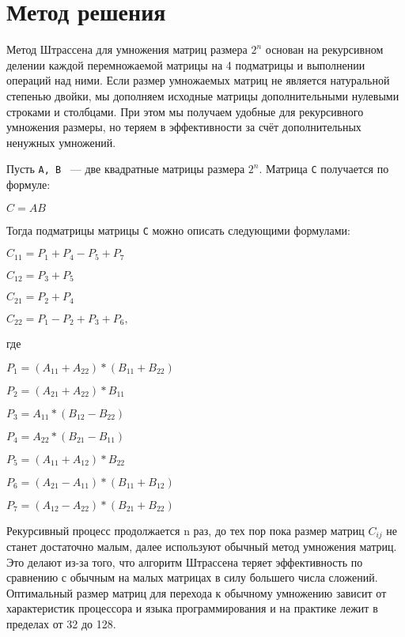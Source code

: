 \documentclass{article}
\begin{document}
\newpage

\section{Метод решения}
Метод Штрассена для умножения матриц размера $2^n$ основан на рекурсивном делении каждой перемножаемой матрицы на 4 подматрицы и выполнении операций над ними.  Если размер умножаемых матриц не является натуральной степенью двойки, мы дополняем исходные матрицы дополнительными нулевыми строками и столбцами. При этом мы получаем удобные для рекурсивного умножения размеры, но теряем в эффективности за счёт дополнительных ненужных умножений.

\par Пусть \verb|A, B| ~--- две квадратные матрицы размера $2^n$. Матрица \verb|C| получается по формуле:

\begin{center} 
 $C=AB$
\end{center}

\par Тогда подматрицы матрицы \verb|C| можно описать следующими формулами:

\begin{center} 
$C_{11}=P_1+P_4-P_5+P_7$

$C_{12}=P_3+P_5$

$C_{21}=P_2+P_4$

$C_{22}=P_1-P_2+P_3+P_6,$
\end{center}

где

\begin{center} 
$P_1=(A_{11}+A_{22})*(B_{11}+B_{22})$

$P_2=(A_{21}+A_{22})*B_{11}$

$P_3=A_{11}*(B_{12}-B_{22})$

$P_4=A_{22}*(B_{21}-B_{11})$

$P_5=(A_{11}+A_{12})*B_{22}$

$P_6=(A_{21}-A_{11})*(B_{11}+B_{12})$

$P_7=(A_{12}-A_{22})*(B_{21}+B_{22})$
\end{center}

\par Рекурсивный процесс продолжается n раз, до тех пор пока размер матриц  $C_{ij}$ не станет достаточно малым, далее используют обычный метод умножения матриц. Это делают из-за того, что алгоритм Штрассена теряет эффективность по сравнению с обычным на малых матрицах в силу большего числа сложений. Оптимальный размер матриц для перехода к обычному умножению зависит от характеристик процессора и языка программирования и на практике лежит в пределах от 32 до 128.
\end{document}
